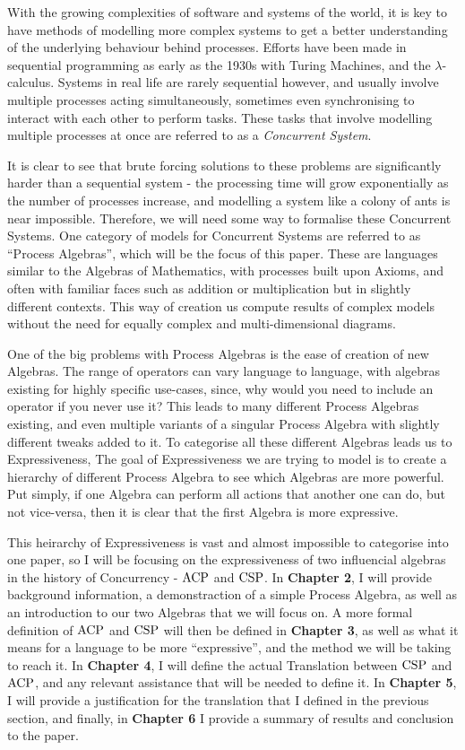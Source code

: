 \documentclass[../hons_project.tex]{subfiles}
\begin{document}
With the growing complexities of software and systems of the world, it is key to have methods of modelling more complex systems to get a better understanding of the underlying behaviour behind processes. Efforts have been made in sequential programming as early as the 1930s with Turing Machines, and the $\lambda$-calculus. Systems in real life are rarely sequential however, and usually involve multiple processes acting simultaneously, sometimes even synchronising to interact with each other to perform tasks. These tasks that involve modelling multiple processes at once are referred to as a \textit{Concurrent System}. 

It is clear to see that brute forcing solutions to these problems are significantly harder than a sequential system - the processing time will grow exponentially as the number of processes increase, and modelling a system like a colony of ants is near impossible. Therefore, we will need some way to formalise these Concurrent Systems. One category of models for Concurrent Systems are referred to as ``Process Algebras'', which will be the focus of this paper. These are languages similar to the Algebras of Mathematics, with processes built upon Axioms, and often with familiar faces such as addition or multiplication but in slightly different contexts. This way of creation us compute results of complex models without the need for equally complex and multi-dimensional diagrams.

One of the big problems with Process Algebras is the ease of creation of new Algebras. The range of operators can vary language to language, with algebras existing for highly specific use-cases, since, why would you need to include an operator if you never use it? This leads to many different Process Algebras existing, and even multiple variants of a singular Process Algebra with slightly different tweaks added to it. To categorise all these different Algebras leads us to Expressiveness, The goal of Expressiveness we are trying to model is to create a hierarchy of different Process Algebra to see which Algebras are more powerful. Put simply, if one Algebra can perform all actions that another one can do, but not vice-versa, then it is clear that the first Algebra is more expressive.

This heirarchy of Expressiveness is vast and almost impossible to categorise into one paper, so I will be focusing on the expressiveness of two influencial algebras in the history of Concurrency - $\mathrm{ACP}$ and $\mathrm{CSP}$. In \textbf{Chapter 2}, I will provide background information, a demonstraction of a simple Process Algebra, as well as an introduction to our two Algebras that we will focus on. A more formal definition of $\mathrm{ACP}$ and $\mathrm{CSP}$ will then be defined in \textbf{Chapter 3}, as well as what it means for a language to be more ``expressive'', and the method we will be taking to reach it. In \textbf{Chapter 4}, I will define the actual Translation between $\mathrm{CSP}$ and $\mathrm{ACP}$, and any relevant assistance that will be needed to define it. In \textbf{Chapter 5}, I will provide a justification for the translation that I defined in the previous section, and finally, in \textbf{Chapter 6} I provide a summary of results and conclusion to the paper.
\end{document}
